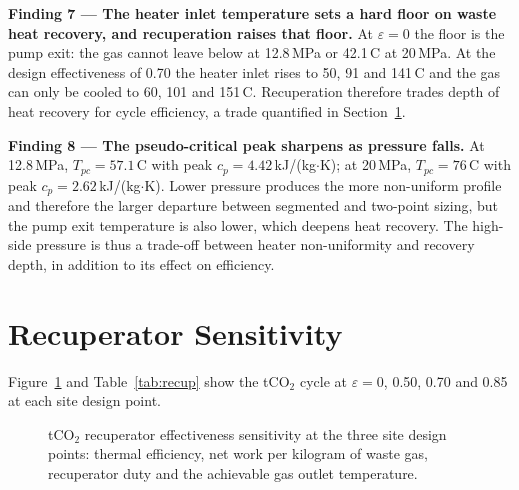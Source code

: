 \begin{findingbox}
\textbf{Finding 7 --- The heater inlet temperature sets a hard floor on waste
heat recovery, and recuperation raises that floor.}
At $\varepsilon = 0$ the floor is the pump exit: the gas cannot leave below
 at 12.8\,MPa or 42.1\,\textdegree C at
20\,MPa. At the design effectiveness of 0.70 the heater inlet rises to 50,
91 and 141\,\textdegree C and the gas can only be cooled to 60, 101 and
151\,\textdegree C. Recuperation therefore trades depth of heat recovery for
cycle efficiency, a trade quantified in Section~\ref{sec:recup_sensitivity}.
\end{findingbox}

\begin{findingbox}
\textbf{Finding 8 --- The pseudo-critical peak sharpens as pressure falls.}
At 12.8\,MPa, $T_{pc} = 57.1$\,\textdegree C with peak $c_p =
4.42$\,kJ/(kg$\cdot$K); at 20\,MPa, $T_{pc} = 76$\,\textdegree C with peak
$c_p = 2.62$\,kJ/(kg$\cdot$K). Lower pressure produces the more non-uniform
profile and therefore the larger departure between segmented and two-point
sizing, but the pump exit temperature is also lower, which deepens heat
recovery. The high-side pressure is thus a trade-off between heater
non-uniformity and recovery depth, in addition to its effect on efficiency.
\end{findingbox}

\section{Recuperator Sensitivity}
\label{sec:recup_sensitivity}

Figure~\ref{fig:recup_sensitivity} and Table~\ref{tab:recup} show the tCO$_2$
cycle at $\varepsilon = 0$, 0.50, 0.70 and 0.85 at each site design point.

\begin{figure}[H]
\centering
{}
\caption{tCO$_2$ recuperator effectiveness sensitivity at the three site design
points: thermal efficiency, net work per kilogram of waste gas, recuperator
duty and the achievable gas outlet temperature.}
\label{fig:recup_sensitivity}
\end{figure}

